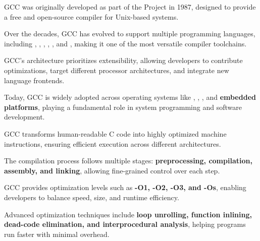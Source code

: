 \begin{NxSSSSBox}
	\begin{NxIDBox}
		GCC was originally developed as part of the  Project in 1987, designed to provide a free and open-source compiler for Unix-based systems.
	\end{NxIDBox}
	\begin{NxIDBox}
	Over the decades, GCC has evolved to support multiple programming languages, including , , , , , and , making it one of the most versatile compiler toolchains.
	\end{NxIDBox}
	\begin{NxIDBox}
		GCC’s architecture prioritizes extensibility, allowing developers to contribute optimizations, target different processor architectures, and integrate new language frontends.
	\end{NxIDBox}
	\begin{NxIDBox}
		Today, GCC is widely adopted across operating systems like , , , and \textbf{embedded platforms}, playing a fundamental role in system programming and software development.
	\end{NxIDBox}
\end{NxSSSSBox}

\begin{NxSSSSBox}
	\begin{NxIDBox}
		GCC transforms human-readable C code into highly optimized machine instructions, ensuring efficient execution across different architectures.
	\end{NxIDBox}
	\begin{NxIDBox}
		The compilation process follows multiple stages: \textbf{preprocessing, compilation, assembly, and linking}, allowing fine-grained control over each step.
	\end{NxIDBox}
	\begin{NxIDBox}
		GCC provides optimization levels such as \textbf{-O1, -O2, -O3, and -Os}, enabling developers to balance speed, size, and runtime efficiency.
	\end{NxIDBox}
	\begin{NxIDBox}
		Advanced optimization techniques include \textbf{loop unrolling, function inlining, dead-code elimination, and interprocedural analysis}, helping programs run faster with minimal overhead.
	\end{NxIDBox}
\end{NxSSSSBox}

